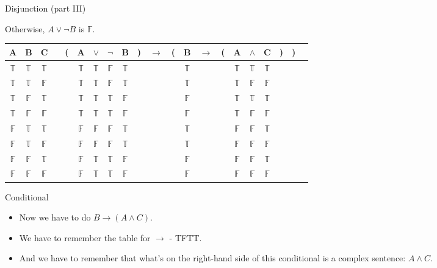 \documentclass[
  ignorenonframetext,
]{beamer}
\providecommand{\tightlist}{%
  \setlength{\itemsep}{0pt}\setlength{\parskip}{0pt}}
\renewcommand{\,}{\text{, }}
\def\True{\mathbb{T}}
\def\False{\mathbb{F}}
\begin{document}
\begin{frame}{Disjunction (part III)}
\protect\hypertarget{disjunction-part-iii}{}

Otherwise, \(A \vee \neg B\) is \(\False\).

\begin{center}
\bigskip
\begin{tabular}{@{ }c@{ }@{ }c@{ }@{ }c | c@{ }@{}c@{}@{ }c@{ }@{ }c@{ }@{ }c@{ }@{ }c@{ }@{}c@{}@{ }c@{ }@{}c@{}@{ }c@{ }@{ }c@{ }@{}c@{}@{ }c@{ }@{ }c@{ }@{ }c@{ }@{}c@{}@{}c@{}@{ }c}
A & B & C &  & ( & A & $\vee$ & $\neg$ & B & ) & $\rightarrow$ & ( & B & $\rightarrow$ & ( & A & $\wedge$ & C & ) & ) & \\
\hline 
 $\True$ & $\True$ & $\True$ &  &  & $\True$ & $\True$ & $\False$ & $\True$ &  &&  & $\True$ &&  & $\True$ & $\True$ & $\True$ &  &  & \\
 $\True$ & $\True$ & $\False$ &  &  & $\True$ & $\True$ & $\False$ & $\True$ &  &&  & $\True$ &&  & $\True$ & $\False$ & $\False$ &  &  & \\
 $\True$ & $\False$ & $\True$ &  &  & $\True$ & $\True$ & $\True$ & $\False$ &  &&  & $\False$ &&  & $\True$ & $\True$ & $\True$ &  &  & \\
 $\True$ & $\False$ & $\False$ &  &  & $\True$ & $\True$ & $\True$ & $\False$ &  &&  & $\False$ &&  & $\True$ & $\False$ & $\False$ &  &  & \\
 $\False$ & $\True$ & $\True$ &  &  & $\False$ & $\False$ & $\False$ & $\True$ &  &&  & $\True$ &&  & $\False$ & $\False$ & $\True$ &  &  & \\
 $\False$ & $\True$ & $\False$ &  &  & $\False$ & $\False$ & $\False$ & $\True$ &  &&  & $\True$ &&  & $\False$ & $\False$ & $\False$ &  &  & \\
 $\False$ & $\False$ & $\True$ &  &  & $\False$ & $\True$ & $\True$ & $\False$ &  &&  & $\False$ &&  & $\False$ & $\False$ & $\True$ &  &  & \\
 $\False$ & $\False$ & $\False$ &  &  & $\False$ & $\True$ & $\True$ & $\False$ &  &&  & $\False$ &&  & $\False$ & $\False$ & $\False$ &  &  & \\
\end{tabular}
\bigskip
\end{center}

\end{frame}

\begin{frame}{Conditional}
\protect\hypertarget{conditional}{}

\begin{itemize}
\tightlist
\item
  Now we have to do \(B \rightarrow (A \wedge C)\).
\item
  We have to remember the table for \(\rightarrow\) - TFTT.
\item
  And we have to remember that what's on the right-hand side of this
  conditional is a complex sentence: \(A \wedge C\).
\end{itemize}

\end{frame}
\end{document}
